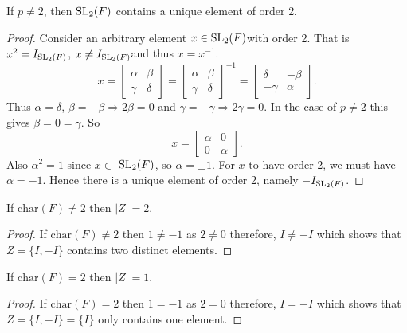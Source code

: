 \begin{lemma}
\label{SpecialSubgroups.exists_unique_orderOf_eq_two}
\leanok
    If $p\neq 2$, then $\operatorname{SL}_2(F)$ contains a unique element of order 2. \\
\end{lemma}
\begin{proof}
\leanok
Consider an arbitrary element $x \in \operatorname{SL}_2(F)$with order 2. That is $x^2 = I_{\operatorname{SL}_2(F)}$, $x \neq I_{\operatorname{SL}_2(F)}$and thus $x=x^{-1}$.
\begin{equation*} 
    x = \begin{bmatrix} \alpha & \beta \\ \gamma & \delta \end{bmatrix} = \begin{bmatrix} \alpha & \beta \\ \gamma & \delta \end{bmatrix}^{-1} = \begin{bmatrix} \delta & - \beta \\ - \gamma & \alpha \end{bmatrix}.
\end{equation*}
\noindent Thus $\alpha = \delta$, $\beta = - \beta \Rightarrow 2\beta = 0$ and $\gamma = - \gamma \Rightarrow 2\gamma = 0$. In the case of $p \neq 2$ this gives $\beta = 0 = \gamma$. So
\begin{equation*} 
    x = \begin{bmatrix} \alpha & 0 \\ 0 & \alpha \end{bmatrix}.
\end{equation*}
\noindent Also $\alpha^2 = 1$ since $x \in$ $\operatorname{SL}_2(F)$, so $\alpha = \pm 1$. For $x$ to have order 2, we must have $\alpha = - 1$. Hence there is a unique element of order 2, namely $- I_{\operatorname{SL}_2(F)}$.
\end{proof}


\begin{lemma}
    \label{SpecialSubgroups.card_Z_eq_two_of_two_ne_zero}
    \leanok
    If $\textrm{char}(F) \ne 2$ then $|Z| = 2$.
\end{lemma}
\begin{proof}
\leanok
    If $\textrm{char}(F) \ne 2$ then $1 \ne -1$ as $2 \ne 0$ therefore, $I \ne -I$ which shows that $Z = \{I , -I\}$ contains two distinct elements.
\end{proof}


\begin{lemma}
    \label{SpecialSubgroups.card_Z_eq_one_of_two_eq_zero}
    \leanok
    If $\textrm{char}(F) = 2$ then $|Z| = 1$. 
\end{lemma}
\begin{proof}
\leanok
    If $\textrm{char}(F) = 2$ then $1 = -1$ as $2 = 0$ therefore, $I = -I$ which shows that $Z = \{I , -I\} = \{I\}$ only contains one element.
\end{proof}


